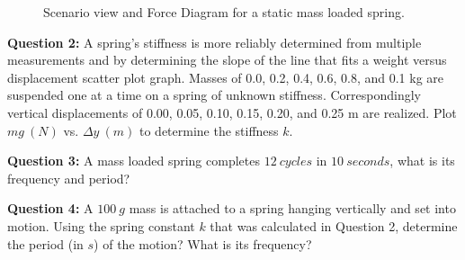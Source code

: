 \documentclass[14pt]{article}
\begin{document}
\begin{figure}[h]
\caption{Scenario view and Force Diagram for a static mass loaded spring.} \label{fig:figure1}
\end{figure}

\vskip 5pt

{\bf Question 2:} A spring's stiffness is more reliably determined from multiple measurements and by determining the slope of the line that fits a weight versus displacement scatter plot graph. Masses of 0.0, 0.2, 0.4, 0.6, 0.8, and 0.1 kg are suspended one at a time on a spring of unknown stiffness. Correspondingly vertical displacements of 0.00, 0.05, 0.10, 0.15, 0.20, and 0.25 m are realized. Plot $mg~(N)$ vs. $\Delta y~(m)$ to determine the stiffness $k$.

\vskip 100pt

{\bf Question 3:} A mass loaded spring completes $12~cycles$ in $10~seconds$, what is its frequency and period?\vskip 60pt

{\bf Question 4:} A $100~g$ mass is attached to a spring hanging vertically and set into motion. Using the spring constant $k$ that was calculated in Question 2, determine the period (in $s$) of the motion? What is its frequency?\vskip 0pt

\end{document}
